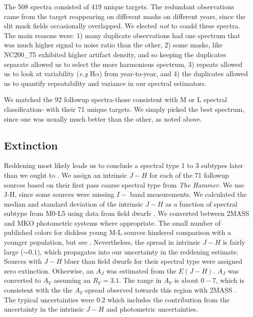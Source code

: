The 508 spectra consisted of 419 unique targets.  The redundant observations came from the target reappearing on different masks on different years, since the slit mask fields occasionally overlapped.  We elected \emph{not} to coadd these spectra.  The main reasons were: 1) many duplicate observations had one spectrum that was much higher signal to noise ratio than the other, 2) some masks, like NC200\_75 exhibited higher artifact density, and so keeping the duplicates separate allowed us to select the more harmonious spectrum, 3) repeats allowed us to look at variability (\emph{e.g} H$\alpha$) from year-to-year, and 4) the duplicates allowed us to quantify repeatability and variance in our spectral estimators.

We matched the 92 followup spectra-those consistent with M or L spectral classification- with their 71 unique targets.  We simply picked the best spectrum, since one was usually much better than the other, as noted above. 


\subsection{Extinction}
Reddening most likely leads us to conclude a spectral type 1 to 3 subtypes later than we ought to \citep{2010A&A...515A..75A}.  We assign an intrinsic $J-H$ for each of the 71 followup sources based on their first pass coarse spectral type from \emph{The Hammer}.  We use J-H, since some sources were missing $I-$ band measurements.  We calculated the median and standard deviation of the intrinsic $J-H$ as a function of spectral subtype from M0-L5 using data from field dwarfs \citep{2011AJ....141...97W,2012ApJS..201...19D}.  We converted between 2MASS and MKO photometric systems where appropriate.  The small number of published colors for diskless young M-L sources hindered comparison with a younger population, but see \citet{2013ApJS..208....9P}.  Nevertheless, the spread in intrinsic $J-H$ is fairly large ($\sim0.1$), which propagates into our uncertainty in the reddening estimate.  Sources with $J-H$ bluer than field dwarfs for their spectral type were assigned zero extinction.  Otherwise, an $A_J$ was estimated from the $E(J-H)$.  $A_J$ was converted to $A_V$ assuming an $R_V=3.1$.  The range in $A_V$ is about $0 - 7$, which is consistent with the the $A_V$ spread observed towards this region with 2MASS \citep{2008A&A...489..143L}.  The typical uncertainties were 0.2 which includes the contribution from the uncertainty in the intrinsic $J-H$ and photometric uncertainties.

